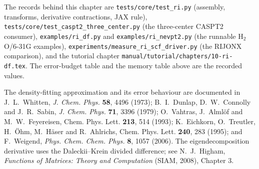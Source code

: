 The records behind this chapter are
\texttt{tests/core/test\_ri.py} (assembly, transforms, derivative
contractions, JAX rule),
\texttt{tests/core/test\_caspt2\_three\_center.py} (the three-center
CASPT2 consumer),
\texttt{examples/ri\_df.py} and \texttt{examples/ri\_nevpt2.py} (the
runnable H$_2$O/6-31G examples),
\texttt{experiments/measure\_ri\_scf\_driver.py} (the RIJONX
comparison), and the tutorial chapter
\texttt{manual/tutorial/chapters/10-ri-df.tex}.  The error-budget table
and the memory table above are the recorded values.

The density-fitting approximation and its error behaviour are
documented in J.~L.~Whitten, \emph{J. Chem. Phys.} \textbf{58}, 4496
(1973); B.~I.~Dunlap, D.~W.~Connolly and J.~R.~Sabin,
\emph{J. Chem. Phys.} \textbf{71}, 3396 (1979);
O.~Vahtras, J.~Alml{\"o}f and M.~W.~Feyereisen,
Chem. Phys. Lett. \textbf{213}, 514 (1993); K.~Eichkorn,
O.~Treutler, H.~{\"O}hm, M.~H{\"a}ser and R.~Ahlrichs,
Chem. Phys. Lett. \textbf{240}, 283 (1995); and F.~Weigend,
\emph{Phys. Chem. Chem. Phys.} \textbf{8}, 1057 (2006).  The
eigendecomposition derivative uses the Daleckii--Krein divided
difference; see N.~J.~Higham, \emph{Functions of Matrices: Theory and
Computation} (SIAM, 2008), Chapter 3.
